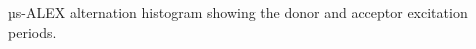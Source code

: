 \label{fig:altern_hist}
µs-ALEX alternation histogram showing the donor and acceptor excitation periods.
